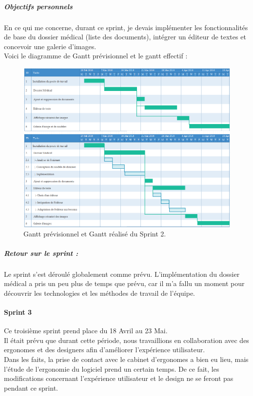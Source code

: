 \subparagraph{Objectifs personnels}
En ce qui me concerne, durant ce sprint, je devais implémenter les fonctionnalités de base du dossier médical (liste des documents), intégrer un éditeur de textes et concevoir une galerie d'images.\\
Voici le diagramme de Gantt prévisionnel et le gantt effectif : 
\begin{figure}[H]
  \centering
  \centerline{\includegraphics[width=20.5cm]{./img/gantt_sprint2}}
  \caption{\label{fig:mb_va_ast} Gantt prévisionnel et Gantt réalisé du Sprint 2.}
\end{figure}

\subparagraph{Retour sur le sprint :}
Le sprint s'est déroulé globalement comme prévu. L'implémentation du dossier médical a pris un peu plus de temps que prévu, car il m'a fallu un moment pour découvrir les technologies et les méthodes de travail de l'équipe.

\newpage
\paragraph*{Sprint 3\\}
Ce troisième sprint prend place du 18 Avril au 23 Mai.\\ 
Il était prévu que durant cette période, nous travaillions en collaboration avec des ergonomes et des designers afin d'améliorer l'expérience utilisateur. \\
Dans les faits, la prise de contact avec le cabinet d'ergonomes a bien eu lieu, mais l'étude de l'ergonomie du logiciel prend un certain temps. De ce fait, les modifications concernant l'expérience utilisateur et le design ne se feront pas pendant ce sprint.

